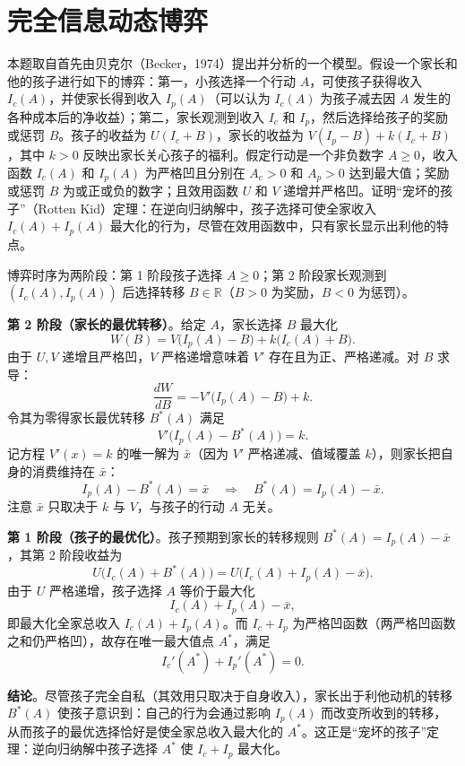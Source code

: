 \chapter{完全信息动态博弈}\label{chap:02}

本题取自首先由贝克尔（Becker，1974）提出并分析的一个模型。假设一个家长和他的孩子进行如下的博弈：第一，小孩选择一个行动 $A$，可使孩子获得收入 $I_c(A)$，并使家长得到收入 $I_p(A)$（可以认为 $I_c(A)$ 为孩子减去因 $A$ 发生的各种成本后的净收益）；第二，家长观测到收入 $I_c$ 和 $I_p$，然后选择给孩子的奖励或惩罚 $B$。孩子的收益为 $U(I_c+B)$，家长的收益为 $V(I_p-B)+k(I_c+B)$，其中 $k>0$ 反映出家长关心孩子的福利。假定行动是一个非负数字 $A\ge 0$，收入函数 $I_c(A)$ 和 $I_p(A)$ 为严格凹且分别在 $A_c>0$ 和 $A_p>0$ 达到最大值；奖励或惩罚 $B$ 为或正或负的数字；且效用函数 $U$ 和 $V$ 递增并严格凹。证明“宠坏的孩子”（Rotten Kid）定理：在逆向归纳解中，孩子选择可使全家收入 $I_c(A)+I_p(A)$ 最大化的行为，尽管在效用函数中，只有家长显示出利他的特点。

\sol
博弈时序为两阶段：第 1 阶段孩子选择 $A\ge 0$；第 2 阶段家长观测到 $(I_c(A),I_p(A))$ 后选择转移 $B\in\mathbb{R}$（$B>0$ 为奖励，$B<0$ 为惩罚）。

\textbf{第 2 阶段（家长的最优转移）}。给定 $A$，家长选择 $B$ 最大化
\[
W(B)=V\!\bigl(I_p(A)-B\bigr)+k\bigl(I_c(A)+B\bigr).
\]\indent
由于 $U,V$ 递增且严格凹，$V$ 严格递增意味着 $V'$ 存在且为正、严格递减。对 $B$ 求导：
\[
\frac{dW}{dB}=-V'\!\bigl(I_p(A)-B\bigr)+k.
\]\indent
令其为零得家长最优转移 $B^*(A)$ 满足
\[
V'\!\bigl(I_p(A)-B^*(A)\bigr)=k.
\]\indent
记方程 $V'(x)=k$ 的唯一解为 $\bar x$（因为 $V'$ 严格递减、值域覆盖 $k$），则家长把自身的消费维持在 $\bar x$：
\[
I_p(A)-B^*(A)=\bar x \quad\Longrightarrow\quad B^*(A)=I_p(A)-\bar x.
\]\indent
注意 $\bar x$ 只取决于 $k$ 与 $V$，与孩子的行动 $A$ 无关。

\textbf{第 1 阶段（孩子的最优化）}。孩子预期到家长的转移规则 $B^*(A)=I_p(A)-\bar x$，其第 2 阶段收益为
\[
U\!\bigl(I_c(A)+B^*(A)\bigr)=U\!\bigl(I_c(A)+I_p(A)-\bar x\bigr).
\]\indent
由于 $U$ 严格递增，孩子选择 $A$ 等价于最大化
\[
I_c(A)+I_p(A)-\bar x,
\]\indent
即最大化全家总收入 $I_c(A)+I_p(A)$。而 $I_c+I_p$ 为严格凹函数（两严格凹函数之和仍严格凹），故存在唯一最大值点 $A^*$，满足
\[
I_c'(A^*)+I_p'(A^*)=0.
\]

\textbf{结论}。尽管孩子完全自私（其效用只取决于自身收入），家长出于利他动机的转移 $B^*(A)$ 使孩子意识到：自己的行为会通过影响 $I_p(A)$ 而改变所收到的转移，从而孩子的最优选择恰好是使全家总收入最大化的 $A^*$。这正是“宠坏的孩子”定理：逆向归纳解中孩子选择 $A^*$ 使 $I_c+I_p$ 最大化。

